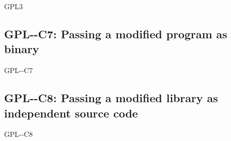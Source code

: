 \begin{license}{GPL3}
\subsection{GPL-\ver-C7: Passing a modified program as binary}
\begin{lsuc}{GPL-\ver-C7}

  \useCaseSeven{\ver}
  \coversSeven

  \begin{lsucrequires}
    \lsucmandatory{\keepLicenseElements}
    \lsucmandatory{\gplthreeEnsureCopyrightNoticeBinary}
    \lsucmandatory{\giveLicense}\passingFilesCorrectly
    \lsucmandatory{\retainCopyrightNotices}
    \lsucmandatory{\markProgramModifications}
    \lsucmandatory{\addToCopyrightDialogApp}
    \lsucmandatory{\arrangeProgramChanges}\howToApplyTheseTerms
    \lsucmandatory{\makeModifiedSourceAvailable}
    \lsucmandatory{\describeHowToGetSource}
    \lsucoptional{\createChangelog}
    \lsucoptional{\addToDocumentation}
  \end{lsucrequires}

  \begin{lsucprohibits}
    \lsucitem{\noPatentLitigation}
  \end{lsucprohibits}
\end{lsuc}

\subsection{GPL-\ver-C8: Passing a modified library as independent source code}
\begin{lsuc}{GPL-\ver-C8}

  \useCaseEight{\ver}
  \coversEight

  \begin{lsucrequires}
     \lsucmandatory{\keepLicenseElements}
    \lsucmandatory{\gplthreeEnsureCopyrightNoticeSource}
    \lsucmandatory{\giveLicense}\passingFilesCorrectly
    \lsucmandatory{\retainCopyrightNotices}
    \lsucmandatory{\markLibraryModifications}
    \lsucmandatory{\arrangeLibraryChanges}\howToApplyTheseTerms
    \lsucoptional{\createChangelog}
    \lsucoptional{\addToDocumentation}
  \end{lsucrequires}

  \begin{lsucprohibits}
    \lsucitem{\noPatentLitigation}
  \end{lsucprohibits}
\end{lsuc}


\end{license}
